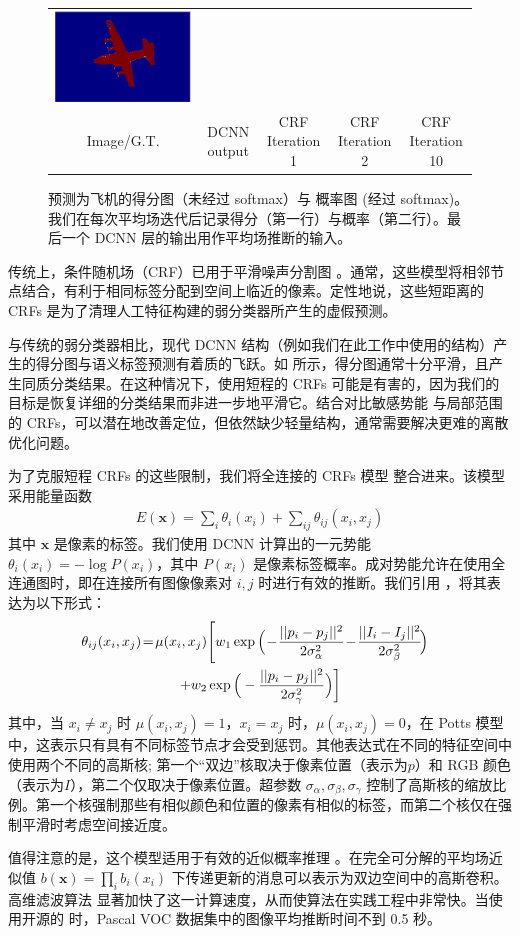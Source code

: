 \begin{figure}[t]
\begin{tabular}{ccccc}
    \includegraphics[width=0.16\linewidth]{fig/mean_field_illustration/Belief_Class1_Itr10.pdf} \\
    {\tiny Image/G.T.} & {\tiny DCNN output} & {\tiny CRF Iteration 1} & {\tiny CRF Iteration 2} & {\tiny CRF Iteration 10} \\
  \end{tabular}
  \caption{预测为飞机的得分图（未经过 softmax）与 概率图 (经过 softmax)。我们在每次平均场迭代后记录得分（第一行）与概率（第二行）。最后一个 DCNN 层的输出用作平均场推断的输入。}
  \label{fig:score-maps}
\end{figure}

传统上，条件随机场（CRF）已用于平滑噪声分割图 \cite{rother2004grabcut, kohli2009robust}。通常，这些模型将相邻节点结合，有利于相同标签分配到空间上临近的像素。定性地说，这些短距离的 CRFs 是为了清理人工特征构建的弱分类器所产生的虚假预测。

与传统的弱分类器相比，现代 DCNN 结构（例如我们在此工作中使用的结构）产生的得分图与语义标签预测有着质的飞跃。如  所示，得分图通常十分平滑，且产生同质分类结果。在这种情况下，使用短程的 CRFs 可能是有害的，因为我们的目标是恢复详细的分类结果而非进一步地平滑它。结合对比敏感势能 \cite{rother2004grabcut} 与局部范围的 CRFs，可以潜在地改善定位，但依然缺少轻量结构，通常需要解决更难的离散优化问题。

为了克服短程 CRFs 的这些限制，我们将全连接的 CRFs 模型 \cite{krahenbuhl2011efficient} 整合进来。该模型采用能量函数
\begin{align}
  E(\boldsymbol{x}) = \sum_i \theta_i(x_i) + \sum_{ij} \theta_{ij}(x_i, x_j)
\end{align}
其中 $\boldsymbol{x}$ 是像素的标签。我们使用 DCNN 计算出的一元势能 $\theta_i(x_i) = - \log P(x_i)$，其中 $P(x_i)$ 是像素标签概率。成对势能允许在使用全连通图时，即在连接所有图像像素对 $i,j$ 时进行有效的推断。我们引用 \cite{krahenbuhl2011efficient}，将其表达为以下形式：
\begin{gather}
  \hspace{-.2cm}\theta_{ij}(x_i, x_j) \!=\! \mu(x_i,x_j)\!\left[w_1 \exp \Big(\!-\!\frac{||p_i-p_j||^2}{2\sigma_\alpha^2} \!-\!\frac{||I_i-I_j||^2}{2\sigma_\beta^2}\! \Big)\right. \nonumber\\
  \left. + w_2 \exp \Big(-\frac{||p_i-p_j||^2}{2\sigma_\gamma^2}\Big)\right]\label{eq:fully_crf}
\end{gather}
其中，当 $x_i \neq x_j$ 时 $\mu(x_i,x_j)= 1$，$x_i = x_j$ 时，$\mu(x_i, x_j)=0$，在 Potts 模型中，这表示只有具有不同标签节点才会受到惩罚。其他表达式在不同的特征空间中使用两个不同的高斯核; 第一个``双边''核取决于像素位置（表示为$ p $）和 RGB 颜色（表示为$ I $），第二个仅取决于像素位置。超参数 $\sigma_\alpha, \sigma_\beta, \sigma_\gamma$ 控制了高斯核的缩放比例。第一个核强制那些有相似颜色和位置的像素有相似的标签，而第二个核仅在强制平滑时考虑空间接近度。

值得注意的是，这个模型适用于有效的近似概率推理 \cite{krahenbuhl2011efficient}。在完全可分解的平均场近似值 $b(\boldsymbol{x}) = \prod_i b_i(x_i)$ 下传递更新的消息可以表示为双边空间中的高斯卷积。高维滤波算法 \cite{adams2010fast} 显著加快了这一计算速度，从而使算法在实践工程中非常快。当使用开源的 \cite{krahenbuhl2011efficient} 时，Pascal VOC 数据集中的图像平均推断时间不到 0.5 秒。
